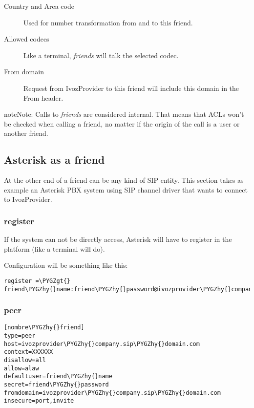 \documentclass[letterpaper,10pt,english]{sphinxmanual}
\def\PYGZgt{\char`\>}
\def\PYGZhy{\char`\-}
\begin{document}
\begin{description}
\item[{Country and Area code}] \leavevmode{}\label{pbx_features/friends:term-country-and-area-code}
Used for number transformation from and to this friend.

\item[{Allowed codecs}] \leavevmode{}\label{pbx_features/friends:term-allowed-codecs}
Like a terminal, \emph{friends} will talk the selected codec.

\item[{From domain}] \leavevmode{}\label{pbx_features/friends:term-from-domain}
Request from IvozProvider to this friend will include this domain in
the From header.

\end{description}

\begin{notice}{note}{Note:}
Calls to \emph{friends} are considered internal. That means that ACLs won't
be checked when calling a friend, no matter if the origin of the call
is a user or another friend.
\end{notice}


\subsection{Asterisk as a friend}
\label{pbx_features/friends:asterisk-as-a-friend}
At the other end of a friend can be any kind of SIP entity. This section takes
as example an Asterisk PBX system using SIP channel driver that wants to connect
to IvozProvider.


\subsubsection{register}
\label{pbx_features/friends:register}
If the system can not be directly access, Asterisk will have to register in the
platform (like a terminal will do).

Configuration will be something like this:

\begin{Verbatim}[commandchars=\\\{\}]
register =\PYGZgt{} friend\PYGZhy{}name:friend\PYGZhy{}password@ivozprovider\PYGZhy{}company.sip\PYGZhy{}domain.com
\end{Verbatim}


\subsubsection{peer}
\label{pbx_features/friends:peer}
\begin{Verbatim}[commandchars=\\\{\}]
[nombre\PYGZhy{}friend]
type=peer
host=ivozprovider\PYGZhy{}company.sip\PYGZhy{}domain.com
context=XXXXXX
disallow=all
allow=alaw
defaultuser=friend\PYGZhy{}name
secret=friend\PYGZhy{}password
fromdomain=ivozprovider\PYGZhy{}company.sip\PYGZhy{}domain.com
insecure=port,invite
\end{Verbatim}
\end{document}
